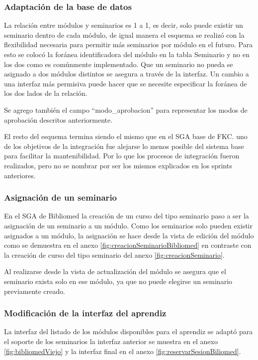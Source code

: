 \subsubsection{Adaptación de la base de datos}

La relación entre módulos y seminarios es 1 a 1, es decir, solo puede existir un seminario dentro de cada módulo, de igual manera el esquema se realizó con la flexibilidad necesaria para permitir más seminarios por módulo en el futuro. Para esto se colocó la foránea identificadora del módulo en la tabla Seminario y no en los dos como es comúnmente implementado. Que un seminario no pueda se asignado a dos módulos distintos se asegura a través de la interfaz. Un cambio a una interfaz más permisiva puede hacer que se necesite especificar la foránea de los dos lados de la relación. 

Se agrego también el campo ``modo\_aprobacion'' para representar los modos de aprobación descritos anteriormente.

El resto del esquema termina siendo el mismo que en el SGA base de FKC. uno de los objetivos de la integración fue alejarse lo menos posible del sistema base para facilitar la mantenibilidad. Por lo que los procesos de integración fueron realizados, pero no se nombrar por ser los mismos explicados en los sprints anteriores.

\subsubsection{Asignación de un seminario}

En el SGA de Bibliomed la creación de un curso del tipo seminario paso a ser la asignación de un seminario a un módulo. Como los seminarios solo pueden existir asignados a un módulo, la asignación se hace desde la vista de edición del módulo como se demuestra en el anexo \ref{fig:creacionSeminarioBibliomed} en contraste con la creación de curso del tipo seminario del anexo \ref{fig:creacionSeminario}.

Al realizarse desde la vista de actualización del módulo se asegura que el seminario exista solo en ese módulo, ya que no puede elegirse un seminario previamente creado.

\subsubsection{Modificación de la interfaz del aprendiz}

La interfaz del listado de los módulos disponibles para el aprendiz se adaptó para el soporte de los seminarios la interfaz anterior se muestra en el anexo \ref{fig:bibliomedViejo} y la interfaz final en el anexo \ref{fig:reservarSesionBiliomed}.

